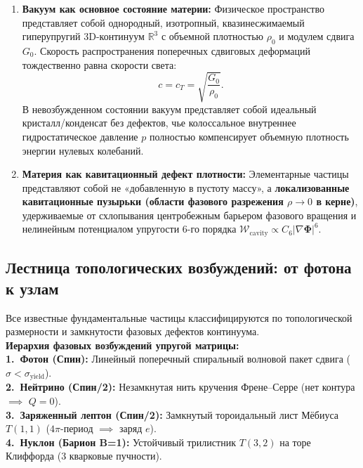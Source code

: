 \documentclass[11pt,a4paper]{article}
\theoremstyle{definition}
\theoremstyle{remark}
\begin{document}
\begin{enumerate}
    \item \textbf{Вакуум как основное состояние материи:} Физическое пространство представляет собой однородный, изотропный, квазинесжимаемый гиперупругий 3D-континуум $\mathbb{R}^3$ с объемной плотностью $\rho_0$ и модулем сдвига $G_0$. Скорость распространения поперечных сдвиговых деформаций тождественно равна скорости света:
    \begin{equation}
        c = c_T = \sqrt{\frac{G_0}{\rho_0}}.
    \end{equation}
    В невозбужденном состоянии вакуум представляет собой идеальный кристалл/конденсат без дефектов, чье колоссальное внутреннее гидростатическое давление $p$ полностью компенсирует объемную плотность энергии нулевых колебаний.
    
    \item \textbf{Материя как кавитационный дефект плотности:} Элементарные частицы представляют собой не «добавленную в пустоту массу», а \textbf{локализованные кавитационные пузырьки (области фазового разрежения $\rho \to 0$ в керне)}, удерживаемые от схлопывания центробежным барьером фазового вращения и нелинейным потенциалом упругости 6-го порядка $\mathcal{W}_{\mathrm{cavity}} \propto C_6 |\nabla \boldsymbol{\Phi}|^6$.
\end{enumerate}

\subsection{Лестница топологических возбуждений: от фотона к узлам}
Все известные фундаментальные частицы классифицируются по топологической размерности и замкнутости фазовых дефектов континуума.\\ 
\textbf{Иерархия фазовых возбуждений упругой матрицы:}\\[1.5mm]
    \textbf{1.\ Фотон\; (Спин):} Линейный поперечный спиральный волновой пакет сдвига ($\sigma < \sigma_{\mathrm{yield}}$).\\[1mm]
    \textbf{2.\ Нейтрино\; (Спин/2):} Незамкнутая нить кручения Френе--Серре (нет контура $\implies$ $Q=0$).\\[1mm]
    \textbf{3.\ Заряженный лептон\; (Спин/2):} Замкнутый тороидальный лист Мёбиуса $T(1,1)$ ($4\pi$-период $\implies$ заряд $e$).\\[1mm]
    \textbf{4.\ Нуклон (Барион\; B=1):} Устойчивый трилистник $T(3,2)$ на торе Клиффорда (3 кварковые пучности).
    
\end{document}

